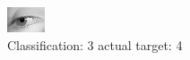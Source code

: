 \begin{figure}[h!]
\begin{center}
\includegraphics[width=0.60\columnwidth]{figures/ID2939_class_3_target_4.png}
\end{center}
\caption{ Classification: 3 actual target: 4}
\label{fig:ID2939_class_3_target_4}
\end{figure}
